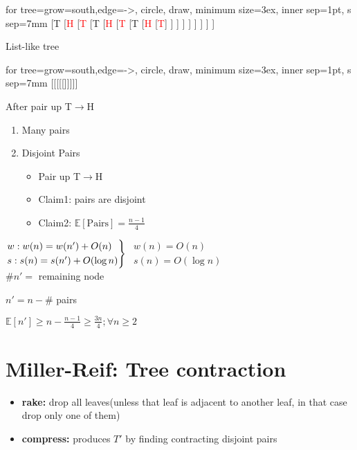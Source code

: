 \documentclass[12pt]{article}
\begin{document}
\begin{multicols}{3}
	\begin{forest}
		for tree={grow=south,edge={->},
			circle, draw, minimum size=3ex, inner sep=1pt,
			s sep=7mm
		}
		[T
		[\textcolor{red}{H}
		[\textcolor{red}{T}
		[T
		[\textcolor{red}{H}
		[\textcolor{red}{T}
		[T
		[\textcolor{red}{H}
		[\textcolor{red}{T}]
		]
		]
		]
		]
		]
		]
		]
		]
	\end{forest}
	List-like tree
	
	\columnbreak
	\begin{forest}
		for tree={grow=south,edge={->},
			circle, draw, minimum size=3ex, inner sep=1pt,
			s sep=7mm
		}
		[[[[[]]]]]
	\end{forest}
	After pair up T$\to$H
	\columnbreak
	\begin{enumerate}
		\item Many pairs
		\item Disjoint Pairs
		\begin{itemize}
			\item Pair up T$\to$H
			\item Claim1: pairs are disjoint
			\item Claim2: $\mathbb{E} [\text{Pairs} ]=\frac{n-1}{4}$
		\end{itemize}
	\end{enumerate}
\end{multicols}
$\begin{rcases*}
w:w(n)=w(n')+O(n)\\
s:s(n)=s(n')+O(\log n)
\end{rcases*}$
$\begin{matrix}
	w(n)=O(n)\\
	s(n)=O(\log n)
\end{matrix}$\\

$\# n'=$ remaining node

$n'=n-\#$  pairs

$\mathbb{E}[n']\geq n-\frac{n-1}{4}\geq\frac{3n}{4}; \forall n\geq 2$

\section{Miller-Reif: Tree contraction}
\begin{itemize}
	\item \textbf{rake:} drop all leaves(unless that leaf is adjacent to another leaf, in that case drop only one of them)
	\item \textbf{compress:} produces $T'$ by finding contracting disjoint pairs
\end{itemize}
\end{document}
